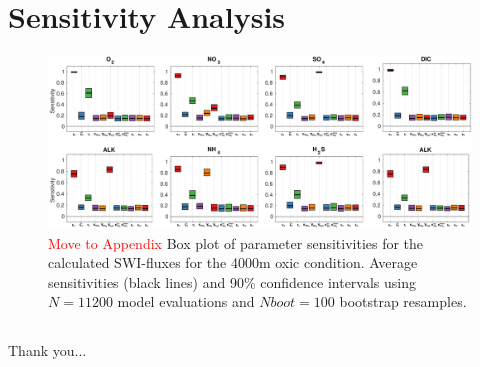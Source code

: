 \documentclass[gmd, manuscript]{copernicus}
\begin{document}
\section{Sensitivity Analysis} 


\begin{figure}[htbp]
\begin{center}
	\includegraphics[width=1.0\textwidth]{figures/SA/0_SIndex_4000m_ALL_combined.pdf}
	\caption{\textcolor{red}{Move to Appendix} Box plot of parameter sensitivities for the calculated SWI-fluxes for the 4000m oxic condition. 
	Average sensitivities (black lines) and 90\% confidence intervals using $N=11200$ model evaluations and $Nboot = 100$ bootstrap resamples.}
	\label{fig:SA_O2+NO3}
	\end{center}
\end{figure}


\subsection{}                               %




\begin{acknowledgements}
Thank you...
\end{acknowledgements}




\newpage



\end{document}
